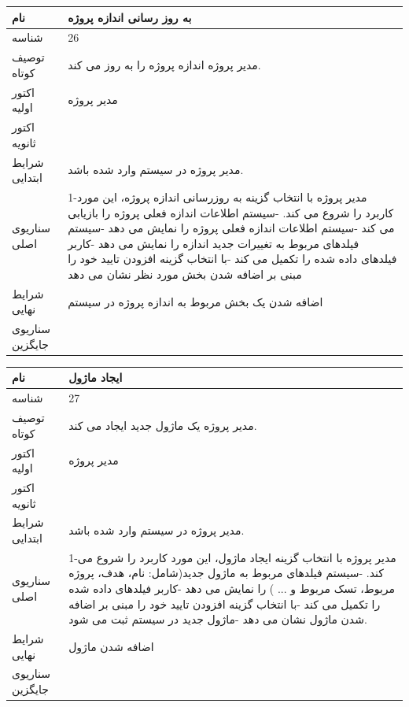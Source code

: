 \documentclass{article}
\begin{document}
\vspace{2cm}

\begin{tabular}{|p{2cm}|p{10cm}|}
\hline
نام
&
به روز رسانی اندازه پروژه
\\
\hline
شناسه
&
26
\\
\hline
توصیف کوتاه
&
مدیر پروژه اندازه پروژه را به روز می کند. 
\\
\hline
اکتور اولیه
&
مدیر پروژه
\\
\hline
اکتور ثانویه
&

\\
\hline
شرایط ابتدایی
&
مدیر پروژه در سیستم وارد شده باشد.
\\
\hline
سناریوی اصلی
&
1-مدیر پروژه با انتخاب گزینه به روزرسانی اندازه پروژه، این مورد کاربرد را شروع می کند.
\newline
2-سیستم اطلاعات اندازه فعلی پروژه را بازیابی می کند
\newline
3-سیستم اطلاعات اندازه فعلی پروژه را نمایش می دهد
\newline
4-سیستم فیلدهای مربوط به  تغییرات جدید اندازه را نمایش می دهد
\newline
5-کاربر فیلدهای داده شده را تکمیل می کند
\newline
6-با انتخاب گزینه افزودن تایید خود را مبنی بر اضافه شدن بخش مورد نظر نشان می دهد
\\
\hline
شرایط نهایی
&
اضافه شدن یک بخش مربوط به اندازه پروژه در سیستم
\\
\hline
سناریوی جایگزین
&

\\
\hline
\end{tabular}


\vspace{2cm}


\begin{tabular}{|p{2cm}|p{10cm}|}
\hline
نام
&
ایجاد ماژول
\\
\hline
شناسه
&
27
\\
\hline
توصیف کوتاه
&
مدیر پروژه یک ماژول جدید ایجاد می کند. 
\\
\hline
اکتور اولیه
&
مدیر پروژه
\\
\hline
اکتور ثانویه
&

\\
\hline
شرایط ابتدایی
&
مدیر پروژه در سیستم وارد شده باشد.
\\
\hline
سناریوی اصلی
&
1-مدیر پروژه با انتخاب گزینه ایجاد ماژول، این مورد کاربرد را شروع می کند.
\newline
2-سیستم فیلدهای مربوط به ماژول جدید(شامل: نام، هدف، پروژه مربوط، تسک مربوط و ... ) را نمایش می دهد
\newline
3-کاربر فیلدهای داده شده را تکمیل می کند
\newline
4-با انتخاب گزینه افزودن تایید خود را مبنی بر اضافه شدن ماژول نشان می دهد
\newline
5-ماژول جدید در سیستم ثبت می شود.
\\
\hline
شرایط نهایی
&
اضافه شدن ماژول
\\
\hline
سناریوی جایگزین
&

\\
\hline
\end{tabular}
\end{document}
